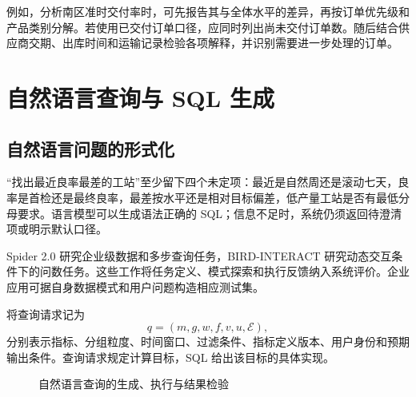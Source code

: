 例如，分析南区准时交付率时，可先报告其与全体水平的差异，再按订单优先级和产品类别分解。若使用已交付订单口径，应同时列出尚未交付订单数。随后结合供应商交期、出库时间和运输记录检验各项解释，并识别需要进一步处理的订单。

\section{自然语言查询与 SQL 生成}

\subsection{自然语言问题的形式化}
“找出最近良率最差的工站”至少留下四个未定项：最近是自然周还是滚动七天，良率是首检还是最终良率，最差按水平还是相对目标偏差，低产量工站是否有最低分母要求。语言模型可以生成语法正确的 SQL；信息不足时，系统仍须返回待澄清项或明示默认口径。

Spider 2.0 研究企业级数据和多步查询任务，BIRD-INTERACT 研究动态交互条件下的问数任务\cite{spider03,bird03}。这些工作将任务定义、模式探索和执行反馈纳入系统评价。企业应用可据自身数据模式和用户问题构造相应测试集。

\begin{definition}[查询请求]
将查询请求记为
\[
q=(m,g,w,f,v,u,\mathcal E),
\]
分别表示指标、分组粒度、时间窗口、过滤条件、指标定义版本、用户身份和预期输出条件。查询请求规定计算目标，SQL 给出该目标的具体实现。
\end{definition}

\begin{figure}[htbp]
\centering
{}
\caption{自然语言查询的生成、执行与结果检验}
\end{figure}

